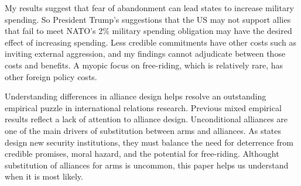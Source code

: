 \documentclass[12pt]{article}
\begin{document}
My results suggest that fear of abandonment can lead states to increase military spending. So President Trump's suggestions that the US may not support allies that fail to meet NATO's 2\% military spending obligation may have the desired effect of increasing spending. Less credible commitments have other costs such as inviting external aggression, and my findings cannot adjudicate between those costs and benefits. A myopic focus on free-riding, which is relatively rare, has other foreign policy costs. 

Understanding differences in alliance design helps resolve an outstanding empirical puzzle in international relations research. Previous mixed empirical results reflect a lack of attention to alliance design. Unconditional alliances are one of the main drivers of substitution between arms and alliances. As states design new security institutions, they must balance the need for deterrence from credible promises, moral hazard, and the potential for free-riding. Althought substitution of alliances for arms is uncommon, this paper helps us understand when it is most likely. 






  
% 
\end{document}
